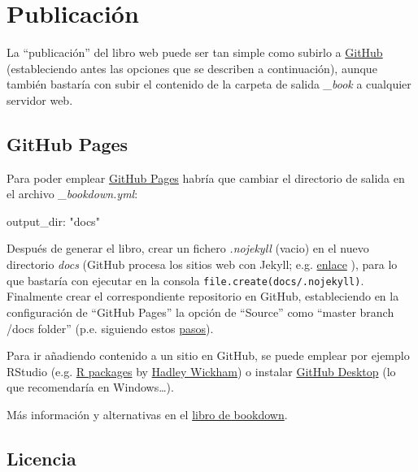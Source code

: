\documentclass[]{book}
\newenvironment{Shaded}{\begin{snugshade}}{\end{snugshade}}
\newcommand{\StringTok}[1]{\textcolor[rgb]{0.31,0.60,0.02}{#1}}
\newcommand{\FunctionTok}[1]{\textcolor[rgb]{0.00,0.00,0.00}{#1}}
\newcommand{\AttributeTok}[1]{\textcolor[rgb]{0.77,0.63,0.00}{#1}}
\theoremstyle{definition}
\theoremstyle{definition}
\theoremstyle{definition}
\theoremstyle{remark}
\begin{document}
\chapter{Publicación}\label{publicacion}

La ``publicación'' del libro web puede ser tan simple como subirlo a
\href{https://help.github.com}{GitHub} (estableciendo antes las opciones
que se describen a continuación), aunque también bastaría con subir el
contenido de la carpeta de salida \emph{\_book} a cualquier servidor
web.

\section{GitHub Pages}\label{github}

Para poder emplear \href{https://pages.github.com}{GitHub Pages} habría
que cambiar el directorio de salida en el archivo \emph{\_bookdown.yml}:

\begin{Shaded}
\begin{Highlighting}[]
\FunctionTok{output_dir:}\AttributeTok{ }\StringTok{"docs"}
\end{Highlighting}
\end{Shaded}

Después de generar el libro, crear un fichero \emph{.nojekyll} (vacio)
en el nuevo directorio \emph{docs} (GitHub procesa los sitios web con
Jekyll; e.g.
\href{https://help.github.com/articles/using-jekyll-as-a-static-site-generator-with-github-pages}{enlace}
), para lo que bastaría con ejecutar en la consola
\texttt{file.create(\textquotesingle{}docs/.nojekyll\textquotesingle{})}.
Finalmente crear el correspondiente repositorio en GitHub, estableciendo
en la configuración de ``GitHub Pages'' la opción de ``Source'' como
``master branch /docs folder'' (p.e. siguiendo estos
\href{https://help.github.com/articles/configuring-a-publishing-source-for-github-pages}{pasos}).

Para ir añadiendo contenido a un sitio en GitHub, se puede emplear por
ejemplo RStudio (e.g. \href{http://r-pkgs.had.co.nz/git.html}{R
packages} by \href{http://hadley.nz/\#code}{Hadley Wickham}) o instalar
\href{https://desktop.github.com}{GitHub Desktop} (lo que recomendaría
en Windows\ldots{}).

Más información y alternativas en el
\href{https://bookdown.org/yihui/bookdown/publishing.html}{libro de
bookdown}.

\section{Licencia}\label{licencia}
\end{document}
